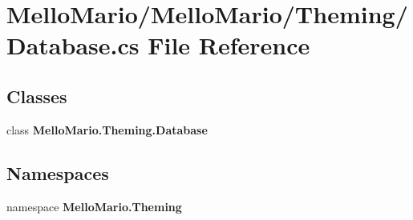 \section{Mello\+Mario/\+Mello\+Mario/\+Theming/\+Database.cs File Reference}
\label{Database_8cs}
\subsection*{Classes}
\begin{DoxyCompactItemize}
\item 
class \textbf{ Mello\+Mario.\+Theming.\+Database}
\end{DoxyCompactItemize}
\subsection*{Namespaces}
\begin{DoxyCompactItemize}
\item 
namespace \textbf{ Mello\+Mario.\+Theming}
\end{DoxyCompactItemize}
